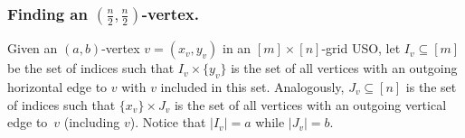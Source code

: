 \documentclass[runningheads,a4paper]{llncs}
\begin{document}
% 
% 

\subsubsection{Finding an $(\frac{n}{2}, \frac{n}{2})$-vertex.}

Given an $(a, b)$-vertex $v = (x_v, y_v)$ in an $[m]\times [n]$-grid USO, let $I_v\subseteq [m]$ be the set of indices such that  $I_v \times \{y_v\}$ is the set of all vertices with an outgoing horizontal edge to $v$ with $v$ included in this set. Analogously, $J_v\subseteq [n]$ is the set of indices such that $\{x_v\}\times J_v$ is the set of all vertices with an outgoing vertical edge to~$v$ (including $v$). Notice that $|I_v| = a$ while $|J_v| = b$.
\end{document}
